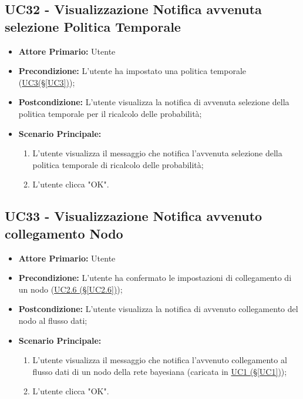 \subsection{UC32 - Visualizzazione Notifica avvenuta selezione Politica Temporale}\label{UC32}

\begin{itemize}
	\item \textbf{Attore Primario:} Utente
	\item \textbf{Precondizione:} L'utente ha impostato una politica temporale (\hyperref[UC3]{UC3(§\ref*{UC3})});
	\item \textbf{Postcondizione:} L'utente visualizza la notifica di avvenuta selezione della politica temporale per il ricalcolo delle probabilità;
	\item \textbf{Scenario Principale:}
	\begin{enumerate}
		\item L'utente visualizza il messaggio che notifica l'avvenuta selezione della politica temporale di ricalcolo delle probabilità;
		\item L'utente clicca "OK".
	\end{enumerate}
\end{itemize}

\pagebreak

\subsection{UC33 - Visualizzazione Notifica avvenuto collegamento Nodo}\label{UC33}

\begin{itemize}
	\item \textbf{Attore Primario:} Utente
	\item \textbf{Precondizione:} L'utente ha confermato le impostazioni di collegamento di un nodo (\hyperref[UC2.6]{UC2.6 (§\ref*{UC2.6})});
	\item \textbf{Postcondizione:} L'utente visualizza la notifica di avvenuto collegamento del nodo al flusso dati;
	\item \textbf{Scenario Principale:}
	\begin{enumerate}
		\item L'utente visualizza il messaggio che notifica l'avvenuto collegamento al flusso dati di un nodo della rete bayesiana (caricata in \hyperref[UC1]{UC1 (§\ref*{UC1})});
		\item L'utente clicca "OK".
	\end{enumerate}
\end{itemize}


